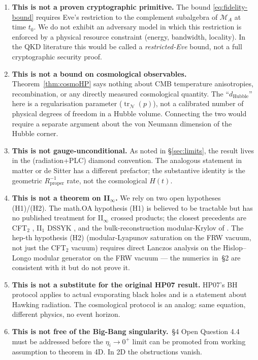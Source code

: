 \documentclass[11pt]{article}
\theoremstyle{definition}
\theoremstyle{remark}
\newcommand{\N}{\mathcal{N}}
\newcommand{\M}{\mathcal{M}}
\newcommand{\tr}{\operatorname{tr}}
\begin{document}
\begin{enumerate}[leftmargin=2em,label={\bf (\arabic*)}]

\item \textbf{This is not a proven cryptographic primitive.}
The bound \eqref{eq:fidelity-bound} requires Eve's restriction to the
complement subalgebra of $\M_A$ at time $t_0$. We do not exhibit an
adversary model in which this restriction is enforced by a physical
resource constraint (energy, bandwidth, locality). In the QKD literature
this would be called a \emph{restricted-Eve} bound, not a full
cryptographic security proof.

\item \textbf{This is not a bound on cosmological observables.}
Theorem~\ref{thm:cosmoHP} says nothing about CMB temperature anisotropies,
recombination, or any directly measured cosmological quantity. The
``$d_{\mathrm{Hubble}}$'' here is a regularisation parameter
($\tr_\N(p)$), not a calibrated number of physical degrees of freedom in a
Hubble volume. Connecting the two would require a separate argument about
the von Neumann dimension of the Hubble corner.

\item \textbf{This is not gauge-unconditional.}
As noted in \S\ref{sec:limits}, the result lives in the (radiation+PLC)
diamond convention. The analogous statement in matter or de Sitter has a
different prefactor; the substantive identity is the geometric
$R_{\mathrm{proper}}^{-1}$ rate, not the cosmological $H(t)$.

\item \textbf{This is not a theorem on II$_\infty$.}
We rely on two open hypotheses (H1)/(H2). The math.OA hypothesis (H1) is
believed to be tractable but has no published treatment for II$_\infty$
crossed products; the closest precedents are CFT$_2$ \cite{CMPT24}, II$_1$
DSSYK \cite{AguilarGutierrez25}, and the bulk-reconstruction
modular-Krylov of \cite{Vardian26}. The hep-th hypothesis (H2)
(modular-Lyapunov saturation on the FRW vacuum, not just the CFT$_2$
vacuum) requires direct Lanczos analysis on the Hislop--Longo modular
generator on the FRW vacuum --- the numerics in \cite{piste1note}\,\S2
are consistent with it but do not prove it.

\item \textbf{This is not a substitute for the original HP07 result.}
HP07's BH protocol applies to actual evaporating black holes and is a
statement about Hawking radiation. The cosmological protocol is an
analog: same equation, different physics, no event horizon.

\item \textbf{This is not free of the Big-Bang singularity.}
\cite{frwnote}\,\S 4 Open Question 4.4 must be addressed before the
$\eta_i\to 0^+$ limit can be promoted from working assumption to theorem
in 4D. In 2D the obstructions vanish.

\end{enumerate}
\end{document}
